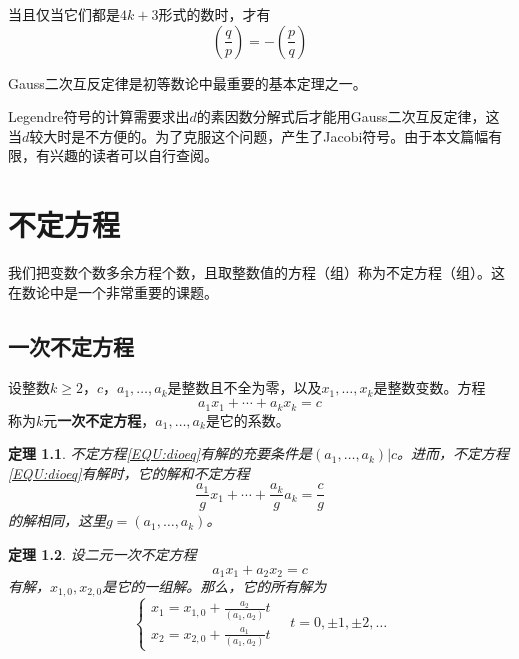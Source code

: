 \documentclass{ctexrep}
\newcommand{\bbold}[1]{\textbf{#1}}
\newtheorem{thrm}{定理}[section]
\begin{document}
当且仅当它们都是$4k+3$形式的数时，才有
\begin{displaymath}
\left(\frac{q}{p}\right)=-\left(\frac{p}{q}\right)
\end{displaymath}

Gauss二次互反定律是初等数论中最重要的基本定理之一。

Legendre符号的计算需要求出$d$的素因数分解式后才能用Gauss二次互反定律，这当$d$较大时是不方便的。为了克服这个问题，产生了Jacobi符号。由于本文篇幅有限，有兴趣的读者可以自行查阅。

\chapter{不定方程}
我们把变数个数多余方程个数，且取整数值的方程（组）称为不定方程（组）。这在数论中是一个非常重要的课题。

\section{一次不定方程}
设整数$k\geq 2$，$c$，$a_1,\dotsc,a_k$是整数且不全为零，以及$x_1,\dotsc,x_k$是整数变数。方程
\begin{equation}\label{EQU:dioeq}
a_1x_1+\dotsb+a_kx_k=c
\end{equation}
称为$k$元\bbold{一次不定方程}，$a_1,\dotsc,a_k$是它的系数。

\begin{thrm}
不定方程\ref{EQU:dioeq}有解的充要条件是$(a_1,\dotsc,a_k)|c$。进而，不定方程\ref{EQU:dioeq}有解时，它的解和不定方程
\begin{equation}
\frac{a_1}{g}x_1+\dotsb+\frac{a_k}{g}a_k=\frac{c}{g}
\end{equation}
的解相同，这里$g=(a_1,\dotsc,a_k)$。
\end{thrm}

\begin{thrm}
设二元一次不定方程
\begin{equation}\label{EQU:two_dioeq}
a_1x_1+a_2x_2=c
\end{equation}
有解，$x_{1,0},x_{2,0}$是它的一组解。那么，它的所有解为
\begin{displaymath}
\left\{
\begin{array}{l}
x_1 = x_{1,0}+\frac{a_2}{(a_1,a_2)}t\\
x_2 = x_{2,0}+\frac{a_1}{(a_1,a_2)}t
\end{array}
\right.
\quad t=0,\pm 1,\pm 2,\dotsc
\end{displaymath}
\end{thrm}
\end{document}
